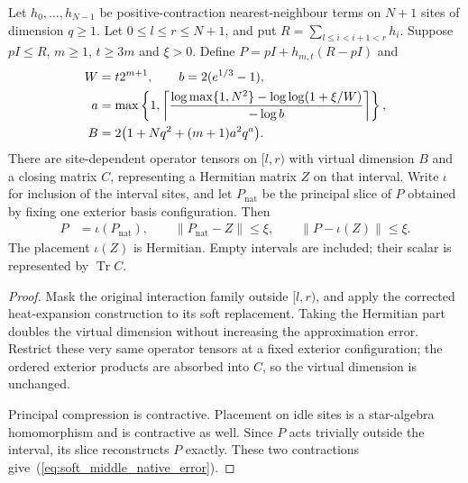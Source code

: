 \begin{lemma}
    \label{lem:native_soft_middle_mpo}
    \leanok
    Let $h_0,\ldots,h_{N-1}$ be positive-contraction nearest-neighbour terms on
    $N+1$ sites of dimension $q\geq1$. Let $0\leq l\leq r\leq N+1$, and put
    $R=\sum_{l\leq i<i+1<r}h_i$. Suppose $pI\leq R$, $m\geq1$, $t\geq3m$
    and $\xi>0$. Define $P=pI+h_{m,t}(R-pI)$ and
    \begin{align}
        W & =t2^{m+1},\qquad b=2(e^{1/3}-1),\notag              \\
        a & =\max\left\{1,
        \left\lceil\frac{\log\max\{1,N^2\}
        -\log\log(1+\xi/W)}{-\log b}\right\rceil\right\},\notag \\
        B & =2\bigl(1+Nq^2+(m+1)a^2q^a\bigr).
        \label{eq:soft_middle_bond}
    \end{align}
    There are site-dependent operator tensors on $[l,r)$ with virtual
    dimension $B$ and a closing matrix $C$, representing a Hermitian matrix
    $Z$ on that interval. Write $\iota$ for inclusion of the interval sites,
    and let $P_{\mathrm{nat}}$ be the principal slice of $P$ obtained by fixing
    one exterior basis configuration. Then
    \begin{align}
        P & =\iota(P_{\mathrm{nat}}),\qquad
        \|P_{\mathrm{nat}}-Z\|\leq\xi,\qquad
        \|P-\iota(Z)\|\leq\xi.
        \label{eq:soft_middle_native_error}
    \end{align}
    The placement $\iota(Z)$ is Hermitian. Empty intervals are included;
    their scalar is represented by $\operatorname{Tr}C$.
\end{lemma}
\begin{proof}
    \leanok
    Mask the original interaction family outside $[l,r)$, and apply the
    corrected heat-expansion construction to its soft replacement. Taking
    the Hermitian part doubles the virtual dimension without increasing
    the approximation error. Restrict these very same operator tensors at
    a fixed exterior configuration; the ordered exterior products are
    absorbed into $C$, so the virtual dimension is unchanged.

    Principal compression is contractive. Placement on idle sites is a
    star-algebra homomorphism and is contractive as well. Since $P$ acts
    trivially outside the interval, its slice reconstructs $P$ exactly.
    These two contractions give~(\ref{eq:soft_middle_native_error}).
\end{proof}

